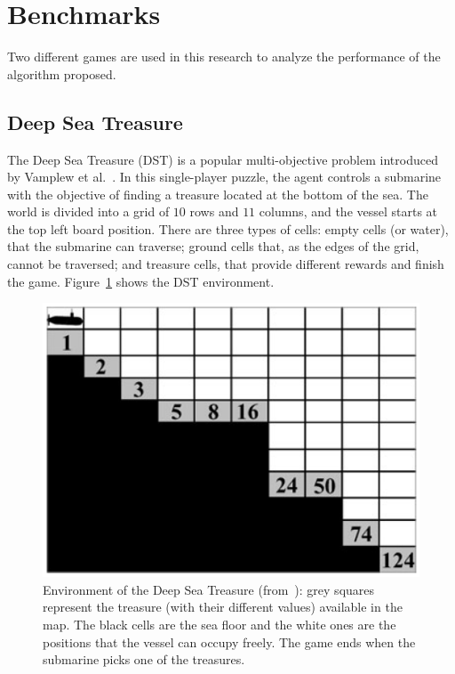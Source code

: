 \documentclass[journal]{IEEEtran}
\begin{document}
\section{Benchmarks} \label{sec:bench}

Two different games are used in this research to analyze the performance of the algorithm proposed.

\subsection{Deep Sea Treasure} \label{ssec:dst}

The Deep Sea Treasure (DST) is a popular multi-objective problem introduced by Vamplew et al.~\cite{Vamplew2010}. In this single-player puzzle, the agent controls a submarine with the objective of finding a treasure located at the bottom of the sea. The world is divided into a grid of $10$ rows and $11$ columns, and the vessel starts at the top left board position. There are three types of cells: empty cells (or water), that the submarine can traverse; ground cells that, as the edges of the grid, cannot be traversed; and treasure cells, that provide different rewards and finish the game. Figure~\ref{fig:dstBase} shows the DST environment.

\begin{figure}[!t]
\begin{center}
\includegraphics[width=0.75\columnwidth]{figures/perez5}
\end{center}
\caption{Environment of the Deep Sea Treasure (from~\cite{Vamplew2010}): grey squares represent the treasure (with their different values) available in the map. The black cells are the sea floor and the white ones are the positions that the vessel can occupy freely. The game ends when the submarine picks one of the treasures.}
\label{fig:dstBase}
\end{figure}
\end{document}
